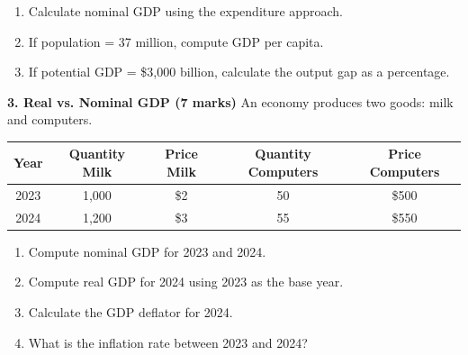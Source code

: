 \documentclass[11pt]{article}
\begin{document}
\begin{enumerate}[label=\alph*)]
    \item Calculate nominal GDP using the expenditure approach.  
    \item If population = 37 million, compute GDP per capita.  
    \item If potential GDP = \$3,000 billion, calculate the output gap as a percentage.  
\end{enumerate}

\bigskip

\textbf{3. Real vs. Nominal GDP (7 marks)}  
An economy produces two goods: milk and computers.  

\begin{center}
\begin{tabular}{c c c c c}
\toprule
Year & Quantity Milk & Price Milk & Quantity Computers & Price Computers \\
\midrule
2023 & 1,000 & \$2 & 50 & \$500 \\
2024 & 1,200 & \$3 & 55 & \$550 \\
\bottomrule
\end{tabular}
\end{center}

\begin{enumerate}[label=\alph*)]
    \item Compute nominal GDP for 2023 and 2024.  
    \item Compute real GDP for 2024 using 2023 as the base year.  
    \item Calculate the GDP deflator for 2024.  
    \item What is the inflation rate between 2023 and 2024?  
\end{enumerate}
\end{document}
